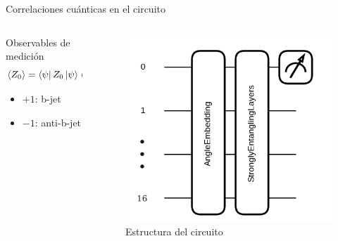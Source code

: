 \documentclass[aspectratio=169]{beamer}
\begin{document}
\begin{frame}{Correlaciones cuánticas en el circuito}
  \begin{columns}
    \begin{column}{0.6\textwidth}
      \vspace{-0.2em}
      \begin{alertblock}{Observables de medición}
        \[ \langle Z_0 \rangle = \bra{\psi} Z_0 \ket{\psi} \in [-1,1] \]
        \begin{itemize}
          \item $+1$: b-jet
          \item $-1$: anti-b-jet
        \end{itemize}
      \end{alertblock}
    \end{column}
    \begin{column}{0.38\textwidth}
      \begin{figure}
        \includegraphics[width=\textwidth]{circuito.png}
        \caption{Estructura del circuito}
      \end{figure}
    \end{column}
  \end{columns}
\end{frame}
\end{document}

